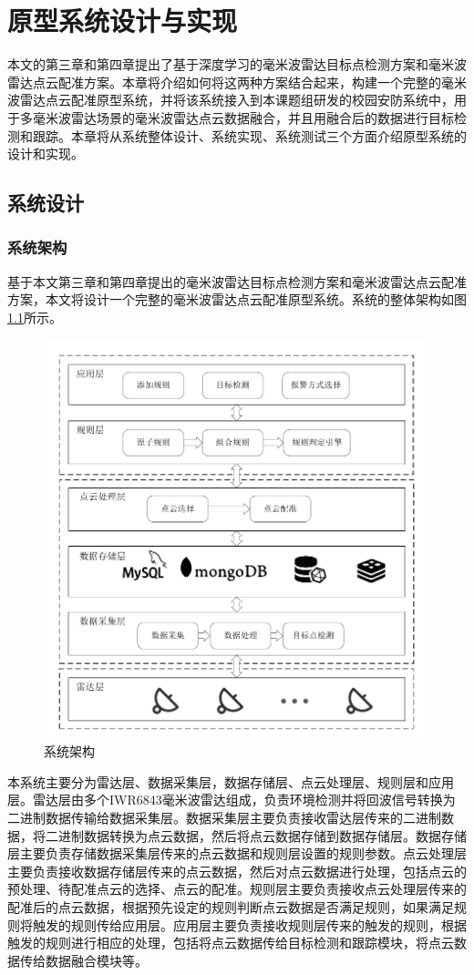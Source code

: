 \chapter{原型系统设计与实现}
本文的第三章和第四章提出了基于深度学习的毫米波雷达目标点检测方案和毫米波雷达点云配准方案。本章将介绍如何将这两种方案结合起来，构建一个完整的毫米波雷达点云配准原型系统，并将该系统接入到本课题组研发的校园安防系统中，用于多毫米波雷达场景的毫米波雷达点云数据融合，并且用融合后的数据进行目标检测和跟踪。本章将从系统整体设计、系统实现、系统测试三个方面介绍原型系统的设计和实现。
\section{系统设计}
\subsection{系统架构}
基于本文第三章和第四章提出的毫米波雷达目标点检测方案和毫米波雷达点云配准方案，本文将设计一个完整的毫米波雷达点云配准原型系统。系统的整体架构如图\ref{fig:系统架构}所示。
\begin{figure}[htbp]
    \centering
    \includegraphics[width=0.9\linewidth]{figures/系统架构.pdf}
    \caption{系统架构}
    \label{fig:系统架构}
\end{figure}
\par
本系统主要分为雷达层、数据采集层，数据存储层、点云处理层、规则层和应用层。雷达层由多个IWR6843毫米波雷达组成，负责环境检测并将回波信号转换为二进制数据传输给数据采集层。数据采集层主要负责接收雷达层传来的二进制数据，将二进制数据转换为点云数据，然后将点云数据存储到数据存储层。数据存储层主要负责存储数据采集层传来的点云数据和规则层设置的规则参数。点云处理层主要负责接收数据存储层传来的点云数据，然后对点云数据进行处理，包括点云的预处理、待配准点云的选择、点云的配准。规则层主要负责接收点云处理层传来的配准后的点云数据，根据预先设定的规则判断点云数据是否满足规则，如果满足规则将触发的规则传给应用层。应用层主要负责接收规则层传来的触发的规则，根据触发的规则进行相应的处理，包括将点云数据传给目标检测和跟踪模块，将点云数据传给数据融合模块等。

